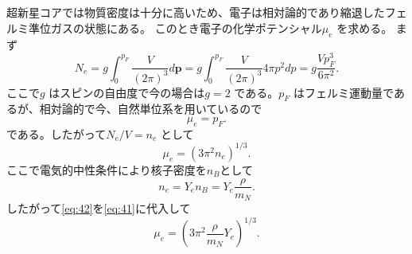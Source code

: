 \documentclass[dvipdfmx]{jsarticle}
\begin{document}
\subsection{}\label{4-2}
超新星コアでは物質密度は十分に高いため、電子は相対論的であり縮退したフェルミ準位ガスの状態にある。
このとき電子の化学ポテンシャル$\mu_e$ を求める。
まず
\[
N_e=g \int_{0}^{p_F} \frac{V}{(2\pi)^3} d\bm{p}=g \int_{0}^{p_F} \frac{V}{(2\pi)^3}4\pi p^2 dp=g \frac{V p_F^3}{6\pi^2} 
.\] 
ここで$g$ はスピンの自由度で今の場合は$g=2$ である。$p_F$ はフェルミ運動量であるが、相対論的で今、自然単位系を用いているので
\[
\mu_e=p_F
.\] 
である。したがって$N_e /V=n_e$ として
\begin{equation}
\label{eq:41}
\mu_e=(3\pi^2n_e)^{1 /3}
.\end{equation}
ここで電気的中性条件により核子密度を$n_B$として
\begin{equation}
\label{eq:42}
n_e=Y_e n_B=Y_e \frac{\rho}{m_N}
.\end{equation}
したがって\eqref{eq:42}を\eqref{eq:41}に代入して
\begin{equation}
\label{eq:43}
\mu_e=\left( 3\pi^2 \frac{\rho}{m_N}Y_e \right) ^{1 /3}
.\end{equation}
\end{document}
